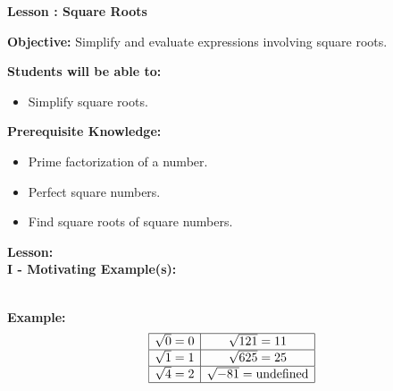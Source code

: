 \documentclass[12pt]{article}
\theoremstyle{definition}
\begin{document}
{\bf \large Lesson : Square Roots}%
\hfill \doclicenseImage[imagewidth=5em]\\
\par
{\bf Objective:} Simplify and evaluate expressions involving square roots.\\
\par
{\bf Students will be able to:}
\begin{itemize}
	\item Simplify square roots.
\end{itemize}
{\bf Prerequisite Knowledge:}
\begin{itemize}
	\item Prime factorization of a number.
	\item Perfect square numbers.
	\item Find square roots of square numbers.
\end{itemize}
\hrulefill

{\bf Lesson:}\\
{\bf I - Motivating Example(s):}\\
\ \par
{\bf Example:}
  \[ \begin{array}{|c|c|}
       \hline
       \sqrt{0} = 0 & \sqrt{121} = 11\\
       \hline
       \sqrt{1} = 1 & \sqrt{625} = 25\\
       \hline
       \sqrt{4} = 2 & \sqrt{- 81} = \text{undefined}\\
       \hline
     \end{array} \]
\end{document}
